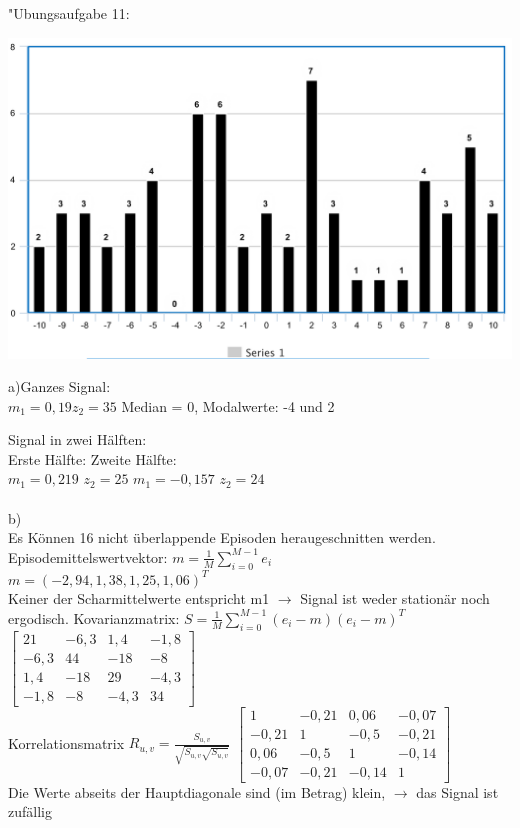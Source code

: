 \documentclass[fleqn,a4paper,12pt]{article}
\begin{document}
	"Ubungsaufgabe 11:\newline
	
	\includegraphics[scale=0.4]{H2}
	
	a)Ganzes Signal:\\
	$m_1 = 0,19		z_2 = 35$ \hspace{1cm}
	Median = 0,	Modalwerte: -4 und 2
	
	Signal in zwei H\"alften:\\
	Erste H\"alfte:	\hspace{5cm}										Zweite H\"alfte:\\
	$m_1 = 0,219$  $z_2 = 25$	\hspace{4cm}								$m_1 = -0,157$  $z_2 = 24$\\
	\\
	b)\\
	Es K\"onnen 16 nicht \"uberlappende Episoden heraugeschnitten werden.
	Episodemittelswertvektor: $m = \frac{1}{M}\sum_{i=0}^{M-1}e_i$\\
	$m = (-2,94, 1,38, 1,25, 1,06)^T$\\
	Keiner der Scharmittelwerte entspricht m1 $\rightarrow$ Signal ist weder station\"ar noch ergodisch.
	\newpage
	Kovarianzmatrix: $S = \frac{1}{M}\sum_{i=0}^{M-1}(e_i-m)(e_i-m)^T$\\
	$
	\begin{bmatrix}
	21   & -6,3 & 1,4	 &  -1,8 \\
	-6,3 & 44 	& -18	 &  -8 \\
	1,4  & -18	& 29 	 & -4,3 \\
	-1,8 & -8 	& -4,3	 &  34
	\end{bmatrix}
	$\\
	Korrelationsmatrix $R_{u,v} = \frac{S_{u,v}}{\sqrt{S_{u,v} \sqrt{S_{u,v}}}}$
	$
	\begin{bmatrix}
	1   & -0,21 & 0,06	 &  -0,07 \\
	-0,21 & 1 	& -0,5	 &  -0,21 \\
	0,06  & -0,5	& 1 	 & -0,14 \\
	-0,07 & -0,21 	& -0,14	 &  1
	\end{bmatrix}
	$\\Die Werte abseits der Hauptdiagonale sind (im Betrag) klein, $\rightarrow$ das Signal ist zuf\"allig\\
\end{document}
